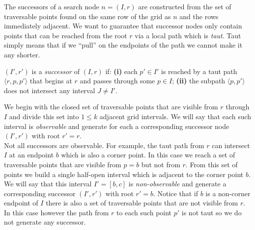 The successors of a search node $n = (I, r)$ are  constructed from the 
set of traversable points found on the same row of the grid as $n$ and 
the rows immediately adjacent. 
We want to guarantee that successor nodes only contain points that
can be reached from the root $r$ via a local path which is \emph{taut}.
Taut simply means that if we ``pull'' on the endpoints of 
the path we cannot make it any shorter.

\begin{defi}
$(I', r')$ is a \emph{successor} of
$(I, r)$ if: \textbf{(i)} each $p' \in I'$ is reached
by a taut path $\langle r, p,  p' \rangle$ that begins
at $r$ and passes through some $p \in I$;
\textbf{(ii)} the subpath $\langle p, p' \rangle$ does not intersect any 
interval $J \neq I'$.
\end{defi}
We begin with the closed set of traversable points that are 
visible from $r$ through $I$ and divide this set into $1 \leq k$
adjacent grid intervals.
We will say that each such interval is \emph{observable} and 
generate for each a corresponding successor node 
$(I', r')$ with root $r' = r$.
\\
Not all successors are observable.
For example, the taut path from $r$ can intersect 
$I$ at an endpoint $b$ which is also a corner point.
In this case we reach a set of traversable points that
are visible from $p = b$ but not from $r$.
From this set of points we build a single half-open 
interval which is adjacent to the corner point $b$.
We will say that this interval $I' = [b, c]$ is 
\emph{non-observable} and generate a corresponding successor 
$(I', r')$ with root $r' = b$.  
Notice that if $b$ is a non-corner endpoint of $I$ there 
is also a set of traversable points that are not visible from $r$.
In this case however the path from $r$ to each such point $p'$ is 
not taut so we do not generate any successor.

%


